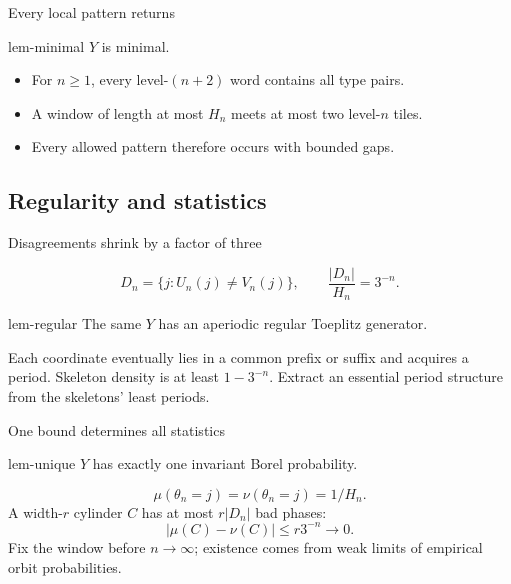 \documentclass{beamer}
\begin{document}
\begin{frame}{Every local pattern returns}

\begin{bookresult}{lem-minimal}
$Y$ is minimal.
\end{bookresult}
\begin{itemize}
\item For $n\geq1$, every level-$(n+2)$ word contains all type pairs.
\item A window of length at most $H_n$ meets at most two level-$n$ tiles.
\item Every allowed pattern therefore occurs with bounded gaps.
\end{itemize}
\end{frame}

\subsection{Regularity and statistics}

\begin{frame}{Disagreements shrink by a factor of three}

\[
D_n=\{j:U_n(j)\ne V_n(j)\},\qquad \frac{|D_n|}{H_n}=3^{-n}.
\]
\begin{bookresult}{lem-regular}
The same $Y$ has an aperiodic regular Toeplitz generator.
\end{bookresult}
Each coordinate eventually lies in a common prefix or suffix and acquires a period. Skeleton density is at least $1-3^{-n}$.
\medskip
Extract an essential period structure from the skeletons’ least periods.
\end{frame}

\begin{frame}{One bound determines all statistics}

\begin{bookresult}{lem-unique}
$Y$ has exactly one invariant Borel probability.
\end{bookresult}
\[
\mu(\theta_n=j)=\nu(\theta_n=j)=1/H_n.
\]
A width-$r$ cylinder $C$ has at most $r|D_n|$ bad phases:
\[
|\mu(C)-\nu(C)|\leq r3^{-n}\longrightarrow0.
\]
Fix the window before $n\to\infty$; existence comes from weak limits of empirical orbit probabilities.
\end{frame}
\end{document}
